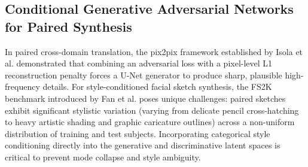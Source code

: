 \documentclass[conference]{IEEEtran}
\begin{document}
\subsection{Conditional Generative Adversarial Networks for Paired Synthesis}
In paired cross-domain translation, the pix2pix framework established by Isola et al. \cite{isola2017image} demonstrated that combining an adversarial loss with a pixel-level L1 reconstruction penalty forces a U-Net generator to produce sharp, plausible high-frequency details. For style-conditioned facial sketch synthesis, the FS2K benchmark introduced by Fan et al. \cite{fan2022facial} poses unique challenges: paired sketches exhibit significant stylistic variation (varying from delicate pencil cross-hatching to heavy artistic shading and graphic caricature outlines) across a non-uniform distribution of training and test subjects. Incorporating categorical style conditioning directly into the generative and discriminative latent spaces is critical to prevent mode collapse and style ambiguity.
\end{document}
